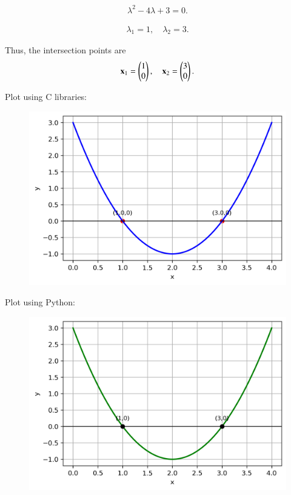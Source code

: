 \documentclass[journal,12pt,onecolumn]{IEEEtran}
\begin{document}
\begin{align}
    \lambda^2 - 4\lambda + 3 = 0.
\end{align}

\begin{align}
    \lambda_1 = 1, \quad \lambda_2 = 3.
\end{align}

Thus, the intersection points are
\begin{align}
    \mathbf{x}_1 = \begin{pmatrix}1 \\ 0\end{pmatrix}, \quad 
    \mathbf{x}_2 = \begin{pmatrix}3 \\ 0\end{pmatrix}.
\end{align}


Plot using C libraries:
\begin{figure}[H]
	\centering
	\includegraphics[scale=0.5]{img1}
	\caption*{}
	\label{img1}
\end{figure}
Plot using Python:
\begin{figure}[H]
	\centering
	\includegraphics[scale=0.5]{img2}
	\caption*{}
	\label{img2}
\end{figure}
\end{document}
